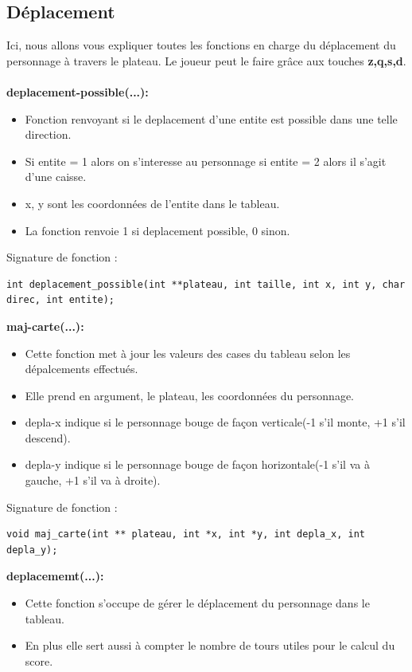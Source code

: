 \documentclass[12pt,french]{article}
\begin{document}
\subsection{Déplacement}
Ici, nous allons vous expliquer toutes les fonctions en charge du déplacement du personnage à travers le plateau. Le joueur peut le faire grâce aux touches \textbf{z,q,s,d}.\\\\
\textbf{deplacement-possible(...):}
\begin{itemize}
\item Fonction renvoyant si le deplacement d'une entite est possible dans une telle direction.
\item Si entite = 1 alors on s'interesse au personnage si entite = 2 alors il s'agit d'une caisse.
\item x, y sont les coordonnées de l'entite dans le tableau.
\item La fonction renvoie 1 si deplacement possible, 0 sinon.
\end{itemize}

Signature de fonction :
\begin{lstlisting}
int deplacement_possible(int **plateau, int taille, int x, int y, char direc, int entite);
\end{lstlisting}

\textbf{maj-carte(...):}
\begin{itemize}
\item Cette fonction met à jour les valeurs des cases du tableau selon les dépalcements effectués.
\item Elle prend en argument, le plateau, les coordonnées du personnage.
\item depla-x indique si le personnage bouge de façon verticale(-1 s'il monte, +1 s'il descend).
\item depla-y indique si le personnage bouge de façon horizontale(-1 s'il va à gauche, +1 s'il va à droite).
\end{itemize}

Signature de fonction :
\begin{lstlisting}
void maj_carte(int ** plateau, int *x, int *y, int depla_x, int depla_y);
\end{lstlisting}

\textbf{deplacememt(...):}
\begin{itemize}
\item Cette fonction s'occupe de gérer le déplacement du personnage dans le tableau.
\item En plus elle sert aussi à compter le nombre de tours utiles pour le calcul du score.
\end{itemize}
\end{document}

